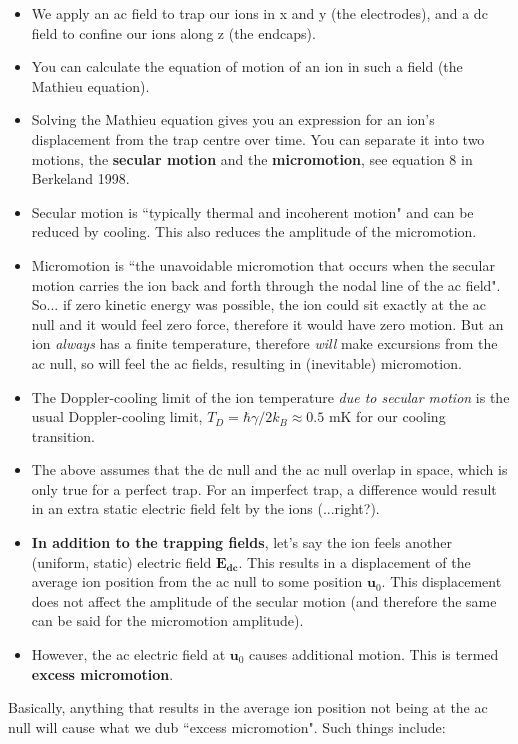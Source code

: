 \documentclass{article}
\begin{document}
\begin{itemize}
\item We apply an ac field to trap our ions in x and y (the electrodes), and a dc field to confine our ions along z (the endcaps).
\item You can calculate the equation of motion of an ion in such a field (the Mathieu equation).
\item Solving the Mathieu equation gives you an expression for an ion's displacement from the trap centre over time. You can separate it into two motions, the \textbf{secular motion} and the \textbf{micromotion}, see equation 8 in Berkeland 1998. 
\item Secular motion is ``typically thermal and incoherent motion" and can be reduced by cooling. This also reduces the amplitude of the micromotion.
\item Micromotion is ``the unavoidable micromotion that occurs when the secular motion carries the ion back and forth through the nodal line of the ac field". So... if zero kinetic energy was possible, the ion could sit exactly at the ac null and it would feel zero force, therefore it would have zero motion. But an ion \textit{always} has a finite temperature, therefore \textit{will} make excursions from the ac null, so will feel the ac fields, resulting in (inevitable) micromotion.
\item The Doppler-cooling limit of the ion temperature \textit{due to secular motion} is the usual Doppler-cooling limit, $T_D = \hbar \gamma / 2 k_B \approx 0.5$ mK for our cooling transition.
\item The above assumes that the dc null and the ac null overlap in space, which is only true for a perfect trap. For an imperfect trap, a difference would result in an extra static electric field felt by the ions (...right?).
\item \textbf{In addition to the trapping fields}, let's say the ion feels another (uniform, static) electric field $\mathbf{E_{dc}}$. This results in a displacement of the average ion position from the ac null to some position $\mathbf{u}_0$. This displacement does not affect the amplitude of the secular motion (and therefore the same can be said for the micromotion amplitude).
\item However, the ac electric field at $\mathbf{u}_0$ causes additional motion. This is termed \textbf{excess micromotion}. 
\end{itemize}

Basically, anything that results in the average ion position not being at the ac null will cause what we dub ``excess micromotion". Such things include:
\end{document}
